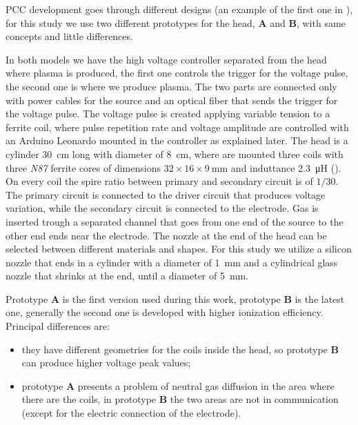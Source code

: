 PCC development goes through different designs (an example of the first one in \cite{ceciliaDBD}), for this study we use two different prototypes for the head, \textbf{A} and \textbf{B}, with same concepts and little differences.

In both models we have the high voltage controller separated from the head where plasma is produced, the first one controls the trigger for the voltage pulse, the second one is where we produce plasma. The two parts are connected only with power cables for the source and an optical fiber that sends the trigger for the voltage pulse. The voltage pulse is created applying variable tension to a ferrite coil, where pulse repetition rate and voltage amplitude are controlled with an Arduino Leonardo mounted in the controller as explained later. The head is a cylinder \SI{30}{\centi\meter} long with diameter of \SI{8}{\centi\meter}, where are mounted three coils with three \emph{N87} ferrite cores of dimensions $32 \times 16 \times \SI{9}{\milli\meter}$ and induttance \SI{2.3}{\micro\henry} (\cite{N87datasheet}). On every coil the spire ratio between primary and secondary circuit is of $1/30$. The primary circuit is connected to the driver circuit that produces voltage variation, while the secondary circuit is connected to the electrode.
Gas is inserted trough a separated channel that goes from one end of the source to the other end ends near the electrode.
The nozzle at the end of the head can be selected between different materials and shapes. For this study we utilize a silicon nozzle that ends in a cylinder with a diameter of \SI{1}{\milli\meter} and a cylindrical glass nozzle that shrinks at the end, until a diameter of \SI{5}{\milli\meter}. 

Prototype \textbf{A} is the first version used during this work, prototype \textbf{B} is the latest one, generally the second one is developed with higher ionization efficiency. Principal differences are:
\begin{itemize}
 \item they have different geometries for the coils inside the head, so prototype \textbf{B} can produce higher voltage peak values;
 \item prototype \textbf{A} presents a problem of neutral gas diffusion in the area where there are the coils, in prototype \textbf{B} the two areas are not in communication (except for the electric connection of the electrode). 
\end{itemize}

